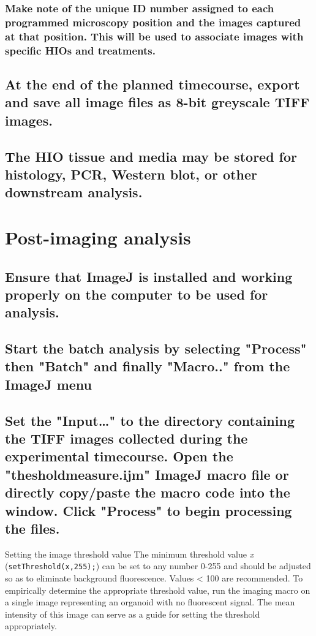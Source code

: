 \documentclass[11pt]{article}
\begin{document}
\subsubsection{{\bfseries\sffamily } Make note of the unique ID number assigned to each programmed microscopy position and the images captured at that position. This will be used to associate images with specific HIOs and treatments.}
\label{sec:orgheadline64}
\subsection{{\bfseries\sffamily } At the end of the planned timecourse, export and save all image files as 8-bit greyscale TIFF images.}
\label{sec:orgheadline66}
\subsection{{\bfseries\sffamily } The HIO tissue and media may be stored for histology, PCR, Western blot, or other downstream analysis.}
\label{sec:orgheadline67}

\section{{\bfseries\sffamily } Post-imaging analysis}
\label{sec:orgheadline73}
\subsection{{\bfseries\sffamily } Ensure that ImageJ \supercite{Schneider:2012} is installed and working properly on the computer to be used for analysis.}
\label{sec:orgheadline69}
\subsection{{\bfseries\sffamily } Start the batch analysis by selecting "Process" then "Batch" and finally "Macro.." from the ImageJ menu}
\label{sec:orgheadline70}
\subsection{{\bfseries\sffamily } Set the "Input\ldots{}" to the directory containing the TIFF images collected during the experimental timecourse. Open the "thesholdmeasure.ijm" ImageJ macro file or directly copy/paste the macro code into the window. Click "Process" to begin processing the files.}
\label{sec:orgheadline71}
\begin{bclogo}[logo=\bcinfo, couleurBarre=Black, noborder=true, couleur=gray!10]{     Setting the image threshold value}
The minimum threshold value \emph{x} (\texttt{setThreshold(x,255);}) can be set to any number 0-255 and should be adjusted so as to eliminate background fluorescence. Values < 100 are recommended. To empirically determine the appropriate threshold value, run the imaging macro on a single image representing an organoid with no fluorescent signal. The mean intensity of this image can serve as a guide for setting the threshold appropriately.\\
\end{bclogo}
\end{document}

